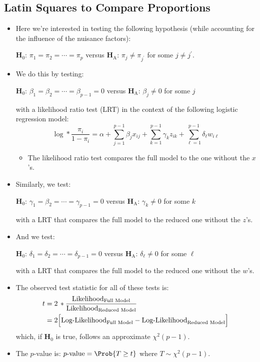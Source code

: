 \subsection{Latin Squares to Compare Proportions}
\begin{itemize}
    \item Here we're interested in testing the following hypothesis (while accounting for the influence of the
          nuisance factors):
          \begin{tightcenter}
              $ \mathbf{H}_0 $: $ \pi_1=\pi_2=\cdots=\pi_p $ versus $ \mathbf{H}_\text{A} $: $ \pi_j\ne \pi_{j^\prime }$ for some $ j\ne j^\prime $.
          \end{tightcenter}
    \item We do this by testing:
          \begin{tightcenter}
              $ \mathbf{H}_0 $: $ \beta_1=\beta_2=\cdots=\beta_{p-1}=0 $ versus $ \mathbf{H}_\text{A} $: $ \beta_j\ne 0$ for some $ j $
          \end{tightcenter}
          with a likelihood ratio test (LRT) in the context of the following logistic regression model:
          \[ \log*{\frac{\pi_i}{1-\pi_i}}=\alpha+\sum_{j=1}^{p-1} \beta_j x_{ij}+\sum_{k=1}^{p-1} \gamma_k z_{ik}+\sum_{\ell=1}^{p-1} \delta_\ell w_{i\ell} \]
          \begin{itemize}
              \item The likelihood ratio test compares the full model to the one without the $ x $'s.
          \end{itemize}
    \item Similarly, we test:
          \begin{tightcenter}
              $ \mathbf{H}_0 $: $ \gamma_1=\beta_2=\cdots=\gamma_{p-1}=0 $ versus $ \mathbf{H}_\text{A} $: $ \gamma_k\ne 0$ for some $ k $
          \end{tightcenter}
          with a LRT that compares the full model to the reduced one without the $ z $'s.
    \item And we test:
          \begin{tightcenter}
              $ \mathbf{H}_0 $: $ \delta_1=\delta_2=\cdots=\delta_{p-1}=0 $ versus $ \mathbf{H}_\text{A} $: $ \delta_\ell\ne 0$ for some $ \ell $
          \end{tightcenter}
          with a LRT that compares the full model to the reduced one without the $ w $'s.
    \item The observed test statistic for all of these tests is:
          \begin{align*}
              t & =2\,\log*{\frac{\text{Likelihood}_{\text{Full Model}}}{\text{Likelihood}_{\text{Reduced Model}}}}    \\
                & =2\Bigl[\text{Log-Likelihood}_{\text{Full Model}}-\text{Log-Likelihood}_{\text{Reduced Model}}\Bigr]
          \end{align*}
          which, if $ \mathbf{H}_0 $ is true, follows an approximate $ \chi^2(p-1) $.
    \item The $ p $-value is: $ p\text{-value}=\Prob{T\ge t} $ where $ T \sim \chi^2(p-1) $.
\end{itemize}
